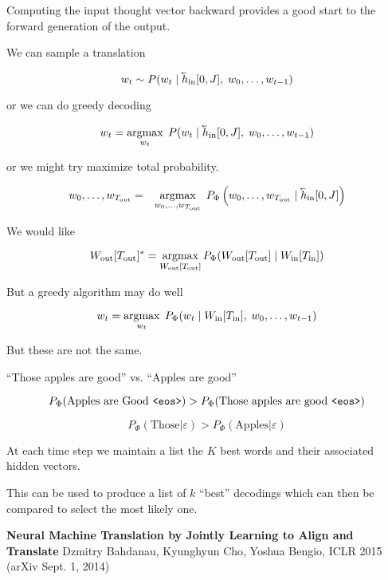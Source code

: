 {\vfill
Computing the input thought vector backward provides a good start to the forward generation of the output.


We can sample a translation

$$w_t \sim P(w_t\;|\;\cev{h}_{\mathrm{in}}[0,J],\;w_0,\ldots,w_{t-1})$$

\vfill
or we can do greedy decoding

$$w_t = \argmax_{w_t}\; P(w_t\;|\;\cev{h}_{\mathrm{in}}[0,J],\;w_0,\ldots,w_{t-1})$$

\vfill
or we might try maximize total probability.

\begin{eqnarray*}
w_0,\ldots,w_{T_{\mathrm{out}}}
& = & \argmax_{w_0,\ldots,w_{T_{\mathrm{out}}}} \;P_\Phi\left(w_0,\ldots,w_{T_{\mathrm{out}}} \;|\; \cev{h}_{\mathrm{in}}[0,J]\right)
\end{eqnarray*}


We would like

\vfill
$$W_{\mathrm{out}}[T_{\mathrm{out}}]^* = \operatorname*{argmax}_{W_{\mathrm{out}}[T_{\mathrm{out}}]}
P_\Phi(W_{\mathrm{out}}[T_{\mathrm{out}}] \;|\;W_{\mathrm{in}}[T_{\mathrm{in}}])$$

\vfill
But a greedy algorithm may do well

\vfill
$$w_t = \operatorname*{argmax}_{w_t}\; P_\Phi(w_t\;|\;W_{\mathrm{in}}[T_{\mathrm{in}}],\;w_0,\ldots,w_{t-1})$$

\vfill
But these are not the same.


``Those apples are good'' vs. ``Apples are good''

\vfill
$$P_\Phi(\mbox{Apples are Good {\tt <eos>}}) > P_\Phi(\mbox{Those apples are good {\tt <eos>}})$$

\vfill
$$P_\Phi(\mbox{Those}|\varepsilon) > P_\Phi(\mbox{Apples}|\varepsilon)$$
    

At each time step we maintain a list the $K$ best words and their associated hidden vectors.

\vfill
This can be used to produce a list of $k$ ``best'' decodings which can then be compared to select
the most likely one.


{\bf Neural Machine Translation by Jointly Learning to {\color{red} Align} and Translate}
Dzmitry Bahdanau, Kyunghyun Cho, Yoshua Bengio, ICLR 2015 (arXiv Sept. 1, 2014)

}
